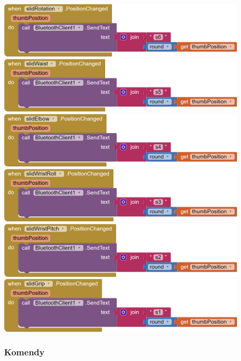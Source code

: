 \documentclass[11pt,titlepage,a4paper]{article}
\begin{document}
\begin{center}
    \includegraphics[width=0.9\textwidth]{img/app_src/sliders/slidRotation.png}
    \includegraphics[width=0.9\textwidth]{img/app_src/sliders/slidWaist.png}
    \includegraphics[width=0.9\textwidth]{img/app_src/sliders/slidElbow.png}
    \includegraphics[width=0.9\textwidth]{img/app_src/sliders/slidWristRoll.png}
    \includegraphics[width=0.9\textwidth]{img/app_src/sliders/slidWristPitch.png}
    \includegraphics[width=0.9\textwidth]{img/app_src/sliders/slidGrip.png}
\end{center}

\newpage

\subsubsection{Komendy}
\end{document}
